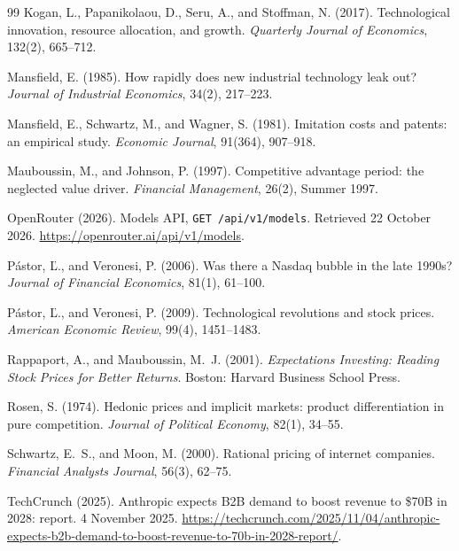 \documentclass[12pt]{article}
\begin{document}
\begin{thebibliography}{99}
Kogan, L., Papanikolaou, D., Seru, A., and Stoffman, N. (2017). Technological innovation, resource allocation, and growth. \textit{Quarterly Journal of Economics}, 132(2), 665--712.

Mansfield, E. (1985). How rapidly does new industrial technology leak out? \textit{Journal of Industrial Economics}, 34(2), 217--223.

Mansfield, E., Schwartz, M., and Wagner, S. (1981). Imitation costs and patents: an empirical study. \textit{Economic Journal}, 91(364), 907--918.

Mauboussin, M., and Johnson, P. (1997). Competitive advantage period: the neglected value driver. \textit{Financial Management}, 26(2), Summer 1997.

OpenRouter (2026). Models API, \texttt{GET /api/v1/models}. Retrieved 22 October 2026. \url{https://openrouter.ai/api/v1/models}.

P\'astor, \v{L}., and Veronesi, P. (2006). Was there a Nasdaq bubble in the late 1990s? \textit{Journal of Financial Economics}, 81(1), 61--100.

P\'astor, \v{L}., and Veronesi, P. (2009). Technological revolutions and stock prices. \textit{American Economic Review}, 99(4), 1451--1483.

Rappaport, A., and Mauboussin, M.~J. (2001). \textit{Expectations Investing: Reading Stock Prices for Better Returns}. Boston: Harvard Business School Press.

Rosen, S. (1974). Hedonic prices and implicit markets: product differentiation in pure competition. \textit{Journal of Political Economy}, 82(1), 34--55.

Schwartz, E.~S., and Moon, M. (2000). Rational pricing of internet companies. \textit{Financial Analysts Journal}, 56(3), 62--75.

TechCrunch (2025). Anthropic expects B2B demand to boost revenue to \$70B in 2028: report. 4 November 2025. \url{https://techcrunch.com/2025/11/04/anthropic-expects-b2b-demand-to-boost-revenue-to-70b-in-2028-report/}.

\end{thebibliography}
\end{document}
